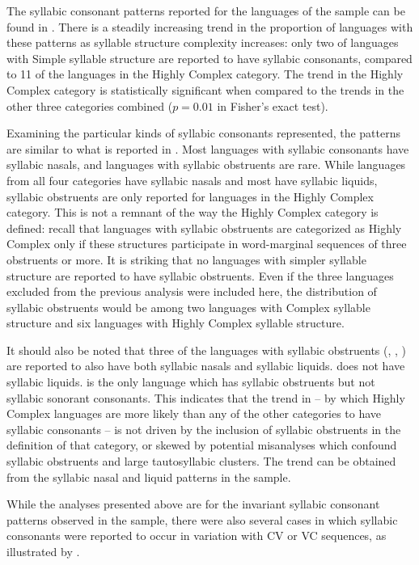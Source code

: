   The syllabic consonant patterns reported for the languages of the sample can be found in . There is a steadily increasing trend in the proportion of languages with these patterns as syllable structure complexity increases: only two of languages with Simple syllable structure are reported to have syllabic consonants, compared to 11 of the languages in the Highly Complex category. The trend in the Highly Complex category is statistically significant when compared to the trends in the other three categories combined ($p = 0.01$ in Fisher’s exact test). 
  
  Examining the particular kinds of syllabic consonants represented, the patterns are similar to what is reported in \citet{Bell1978a}. Most languages with syllabic consonants have syllabic nasals, and languages with syllabic obstruents are rare. While languages from all four categories have syllabic nasals and most have syllabic liquids, syllabic obstruents are only reported for languages in the Highly Complex category. This is not a remnant of the way the Highly Complex category is defined: recall that languages with syllabic obstruents are categorized as Highly Complex only if these structures participate in word-marginal sequences of three obstruents or more. It is striking that no languages with simpler syllable structure are reported to have syllabic obstruents. Even if the three languages excluded from the previous analysis were included here, the distribution of syllabic obstruents would be among two languages with Complex syllable structure and six languages with Highly Complex syllable structure. 

  It should also be noted that three of the languages with syllabic obstruents (, , ) are reported to also have both syllabic nasals and syllabic liquids.  does not have syllabic liquids.  is the only language which has syllabic obstruents but not syllabic sonorant consonants. This indicates that the trend in  -- by which Highly Complex languages are more likely than any of the other categories to have syllabic consonants  -- is not driven by the inclusion of syllabic obstruents in the definition of that category, or skewed by potential misanalyses which confound syllabic obstruents and large tautosyllabic clusters. The trend can be obtained from the syllabic nasal and liquid patterns in the sample.

  While the analyses presented above are for the invariant syllabic consonant patterns observed in the sample, there were also several cases in which syllabic consonants were reported to occur in variation with CV or VC sequences, as illustrated by .

